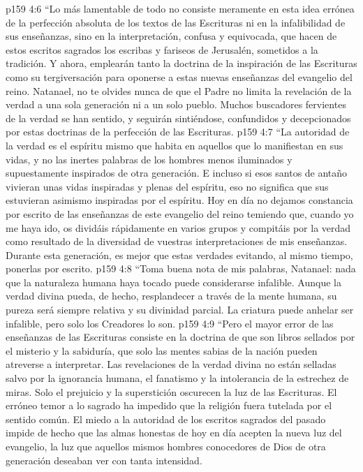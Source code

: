 \vs p159 4:6 “Lo más lamentable de todo no consiste meramente en esta idea errónea de la perfección absoluta de los textos de las Escrituras ni en la infalibilidad de sus enseñanzas, sino en la interpretación, confusa y equivocada, que hacen de estos escritos sagrados los escribas y fariseos de Jerusalén, sometidos a la tradición. Y ahora, emplearán tanto la doctrina de la inspiración de las Escrituras como su tergiversación para oponerse a estas nuevas enseñanzas del evangelio del reino. Natanael, no te olvides nunca de que el Padre no limita la revelación de la verdad a una sola generación ni a un solo pueblo. Muchos buscadores fervientes de la verdad se han sentido, y seguirán sintiéndose, confundidos y decepcionados por estas doctrinas de la perfección de las Escrituras.
\vs p159 4:7 “La autoridad de la verdad es el espíritu mismo que habita en aquellos que lo manifiestan en sus vidas, y no las inertes palabras de los hombres menos iluminados y supuestamente inspirados de otra generación. E incluso si esos santos de antaño vivieran unas vidas inspiradas y plenas del espíritu, eso no significa que sus  estuvieran asimismo inspiradas por el espíritu. Hoy en día no dejamos constancia por escrito de las enseñanzas de este evangelio del reino temiendo que, cuando yo me haya ido, os dividáis rápidamente en varios grupos y compitáis por la verdad como resultado de la diversidad de vuestras interpretaciones de mis enseñanzas. Durante esta generación, es mejor que  estas verdades evitando, al mismo tiempo, ponerlas por escrito.
\vs p159 4:8 “Toma buena nota de mis palabras, Natanael: nada que la naturaleza humana haya tocado puede considerarse infalible. Aunque la verdad divina pueda, de hecho, resplandecer a través de la mente humana, su pureza será siempre relativa y su divinidad parcial. La criatura puede anhelar ser infalible, pero solo los Creadores lo son.
\vs p159 4:9 “Pero el mayor error de las enseñanzas de las Escrituras consiste en la doctrina de que son libros sellados por el misterio y la sabiduría, que solo las mentes sabias de la nación pueden atreverse a interpretar. Las revelaciones de la verdad divina no están selladas salvo por la ignorancia humana, el fanatismo y la intolerancia de la estrechez de miras. Solo el prejuicio y la superstición oscurecen la luz de las Escrituras. El erróneo temor a lo sagrado ha impedido que la religión fuera tutelada por el sentido común. El miedo a la autoridad de los escritos sagrados del pasado impide de hecho que las almas honestas de hoy en día acepten la nueva luz del evangelio, la luz que aquellos mismos hombres conocedores de Dios de otra generación deseaban ver con tanta intensidad.
